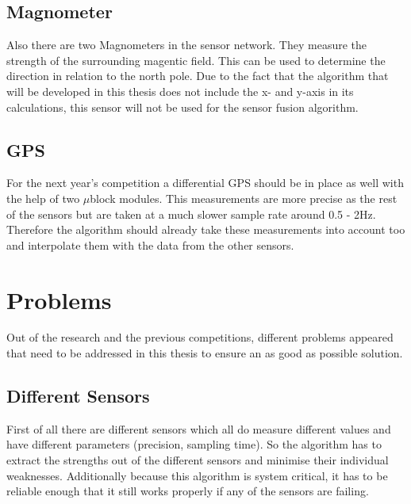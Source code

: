  \subsection{Magnometer}
 Also there are two Magnometers in the sensor network. They measure the strength of the surrounding magentic field.
 This can be used to determine the direction in relation to the north pole.
 Due to the fact that the algorithm that will be developed in this thesis does not include the x- and y-axis in its calculations,
 this sensor will not be used for the sensor fusion algorithm.

 \subsection{GPS}
 For the next year's competition a differential GPS should be in place as well with the help of two $\mu$block modules.
 This measurements are more precise as the rest of the sensors but are taken at a much slower sample rate around 0.5 - 2Hz.
 Therefore the algorithm should already take these measurements into account too and interpolate them with the data from the other sensors.

 \newpage
 \section{Problems}
 Out of the research and the previous competitions, different problems appeared that need to be addressed in this thesis to ensure an as good as possible solution.

 \subsection{Different Sensors}
 First of all there are different sensors which all do measure different values and have different parameters (precision, sampling time).
 So the algorithm has to extract the strengths out of the different sensors and minimise their individual weaknesses.
 Additionally because this algorithm is system critical, it has to be reliable enough that it still works properly if any of the sensors are failing.

